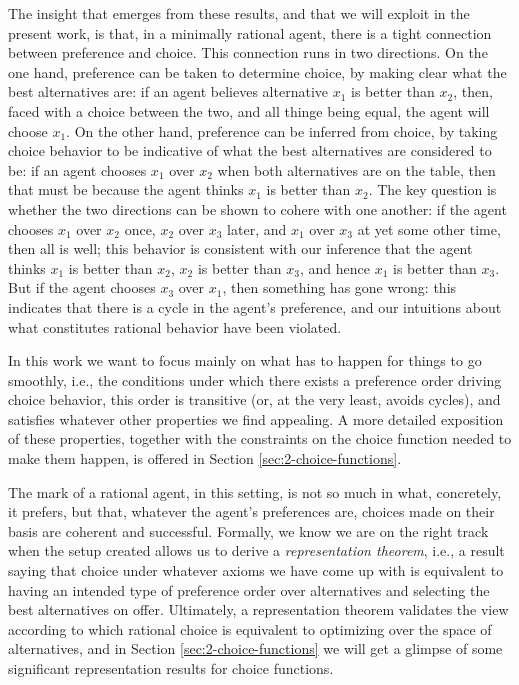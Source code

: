 The insight that emerges from these results, 
and that we will exploit in the present work,
is that, in a minimally rational agent, 
there is a tight connection between preference and choice.
This connection runs in two directions.
On the one hand, preference can be taken to determine choice, 
by making clear what the best alternatives are:
if an agent believes alternative $x_1$ is better than $x_2$, then, 
faced with a choice between the two, and all thinge being equal,
the agent will choose $x_1$.
On the other hand, preference can be inferred from choice, 
by taking choice behavior to be indicative of what the best 
alternatives are considered to be:
if an agent chooses $x_1$ over $x_2$ when both alternatives are on the table,
then that must be because the agent thinks $x_1$ is better than $x_2$.
The key question is whether the two directions 
can be shown to cohere with one another:
if the agent chooses $x_1$ over $x_2$ once, $x_2$ over $x_3$ later, 
and $x_1$ over $x_3$ at yet some other time, 
then all is well; this behavior is consistent with our inference 
that the agent thinks $x_1$ is better than $x_2$,
$x_2$ is better than $x_3$, and hence $x_1$ is better than $x_3$. 
But if the agent chooses $x_3$ over $x_1$, then something has gone wrong: 
this indicates that there is a cycle in the agent's preference,
and our intuitions about what constitutes rational behavior have been violated. 

In this work we want to focus mainly on what 
has to happen for things to go smoothly,
i.e., the conditions under which there exists 
a preference order driving choice behavior, 
this order is transitive (or, at the very least, avoids cycles),
and satisfies whatever other properties we find appealing.
A more detailed exposition of these properties,
together with the constraints on the choice function needed 
to make them happen,
is offered in Section \ref{sec:2-choice-functions}.

The mark of a rational agent, in this setting, is not 
so much in what, concretely, it prefers,
but that, whatever the agent's preferences are, 
choices made on their basis are coherent and successful.
Formally, we know we are on the right track when the setup created
allows us to derive a \emph{representation theorem},
i.e., a result saying that choice under whatever axioms we have come up with 
is equivalent to having an intended type of preference order over alternatives 
and selecting the best alternatives on offer.
Ultimately, a representation theorem validates the view according to which
rational choice is equivalent to optimizing over the space of alternatives,
and in Section \ref{sec:2-choice-functions} we will get a glimpse of 
some significant representation results for choice functions.

